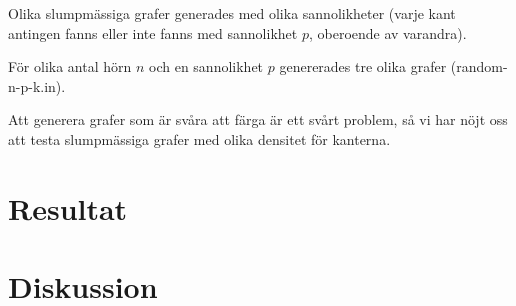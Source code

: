 \documentclass[a4paper]{report}
\begin{document}
Olika slumpmässiga grafer generades med olika sannolikheter (varje kant antingen fanns eller inte fanns med sannolikhet $p$, oberoende av varandra).

För olika antal hörn $n$ och en sannolikhet $p$ genererades tre olika grafer (random-n-p-k.in).

Att generera grafer som är svåra att färga är ett svårt problem, så vi har nöjt oss att testa slumpmässiga grafer med olika densitet för kanterna.

\chapter{Resultat}
\chapter{Diskussion}

\nocite{VanLint:2006}

{}
\end{document}
